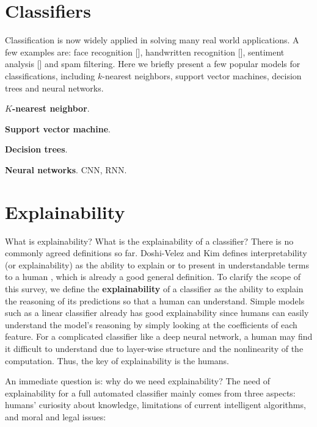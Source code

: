 
\section{Classifiers}

Classification is now widely applied in solving many real world applications. A few examples are: face recognition [], handwritten recognition [], sentiment analysis [] and spam filtering. 
Here we briefly present a few popular models for classifications, including $k$-nearest neighbors, support vector machines, decision trees and neural networks.

\textbf{$K$-nearest neighbor}.

\textbf{Support vector machine}.

\textbf{Decision trees}.

\textbf{Neural networks}. CNN, RNN.

\section{Explainability}

What is explainability? What is the explainability of a classifier? There is no commonly agreed definitions so far. Doshi-Velez and Kim defines interpretability (or explainability) as the ability to explain or to present in understandable terms to a human \cite{doshi-velez2017interpretableml}, which is already a good general definition. To clarify the scope of this survey, we define the \textbf{explainability} of a classifier as the ability to explain the reasoning of its predictions so that a human can understand. Simple models such as a linear classifier already has good explainability since humans can easily understand the model's reasoning by simply looking at the coefficients of each feature. For a complicated classifier like a deep neural network, a human may find it difficult to understand due to layer-wise structure and the nonlinearity of the computation. Thus, the key of explainability is the humans.

An immediate question is: why do we need explainability? 
The need of explainability for a full automated classifier mainly comes from three aspects: humans' curiosity about knowledge, limitations of current intelligent algorithms, and moral and legal issues:

